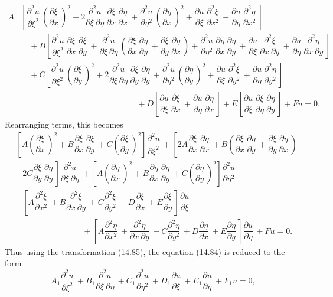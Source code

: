 \documentclass[11pt,a4paper, twoside]{report}
\newcommand{\pf}[2]{\dfrac{\partial #1}{\partial #2}\,}
\newcommand{\pfn}[3]{\dfrac{\partial^#3 #1}{\partial #2^#3}\,}
\newcommand{\pfp}[4]{\dfrac{\partial^#4 #1}{\partial #2\ \partial #3}\,}
\begin{document}
	\begin{equation*}
		\begin{split}
			A & \left[\pfn{u}{\xi}{2} \left(\pf{\xi}{x}\right)^2 + 2\pfp{u}{\xi}{\eta}{2}\pf{\xi}{x}\pf{\eta}{x} + \pfn{u}{\eta}{2}\left(\pf{\eta}{x}\right)^2 + \pf{u}{\xi}\pfn{\xi}{x}{2} + \pf{u}{\eta}\pfn{\eta}{x}{2}\right]\\
			& \quad + B\left[\pfn{u}{\xi}{2}\pf{\xi}{x}\pf{\xi}{y} + \pfp{u}{\xi}{\eta}{2}\left(\pf{\xi}{x}\pf{\eta}{y} + \pf{\xi}{y}\pf{\eta}{x}\right) + \pfn{u}{\eta}{2}\pf{\eta}{x}\pf{\eta}{y} + \pf{u}{\xi}\pfp{\xi}{x}{y}{2} + \pf{u}{\eta}\pfp{\eta}{x}{y}{2}\right]\\
			& \quad + C \left[\pfn{u}{\xi}{2}\left(\pf{\xi}{y}\right)^2 + 2\pfp{u}{\xi}{\eta}{2}\pf{\xi}{y}\pf{\eta}{y} + \pfn{u}{\eta}{2}\left(\pf{\eta}{y}\right)^2 + \pf{u}{\xi}\pfn{\xi}{y}{2} + \pf{u}{\eta}\pfn{\eta}{y}{2}\right]\\
			& \qquad \qquad \qquad \qquad \qquad \qquad \qquad + D\left[\pf{u}{\xi}\pf{\xi}{x} + \pf{u}{\eta}\pf{\eta}{x}\right] + E\left[\pf{u}{\xi}\pf{\xi}{\eta}\pf{\eta}{y}\right] + Fu = 0.
		\end{split}
	\end{equation*}
	Rearranging terms, this becomes
	\begin{equation*}
		\begin{split}
			& \left[A\left(\pf{\xi}{x}\right)^2 + B\pf{\xi}{x}\pf{\xi}{y} + C\left(\pf{\xi}{y}\right)^2\right]\pfn{u}{\xi}{2} + \left[2A\pf{\xi}{x}\pf{\eta}{x} + B\left(\pf{\xi}{x}\pf{\eta}{y} + \pf{\xi}{y}\pf{\eta}{x}\right) \right.\\
			& \left. + 2C \pf{\xi}{y}\pf{\eta}{y}\right]\pfp{u}{\xi}{\eta}{2} + \left[A\left(\pf{\eta}{x}\right)^2 + B\pf{\eta}{x}\pf{\eta}{y} + C\left(\pf{\eta}{y}\right)^2\right]\pfn{u}{\eta}{2}\\
			& + \left[A\pfn{\xi}{x}{2} + B\pfp{\xi}{x}{y}{2} + C\pfn{\xi}{y}{2} + D\pf{\xi}{x} + E\pf{\xi}{y}\right]\pf{u}{\xi}\\
			& \qquad \qquad \qquad \qquad + \left[A\pfn{\eta}{x}{2} + \pfp{\eta}{x}{y}{2} + C\pfn{\eta}{y}{2} + D\pf{\eta}{x} + E\pf{\eta}{y}\right]\pf{u}{\eta} + Fu = 0.
		\end{split}
	\end{equation*}
	Thus using the transformation (14.85), the equation (14.84) is reduced to the form
	\begin{equation}\tag{14.92}
		A_1\pfn{u}{\xi}{2} + B_1\pfp{u}{\xi}{\eta}{2} + C_1 \pfn{u}{\eta}{2} + D_1 \pf{u}{\xi} + E_1 \pf{u}{\eta} + F_1u = 0,
	\end{equation}
\end{document}

